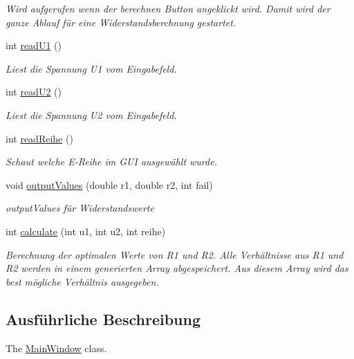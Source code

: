 \begin{DoxyCompactItemize}
\begin{DoxyCompactList}\small\item\em Wird aufgerufen wenn der berechnen Button angeklickt wird. Damit wird der ganze Ablauf für eine Widerstandsberchnung gestartet. \end{DoxyCompactList}\item 
int \hyperlink{classMainWindow_a3b94ad2c855f6a0df3579c48b1a6f6fd}{read\+U1} ()
\begin{DoxyCompactList}\small\item\em Liest die Spannung U1 vom Eingabefeld. \end{DoxyCompactList}\item 
int \hyperlink{classMainWindow_ab9a4bb81031d0bcb5cc5d181a26f3429}{read\+U2} ()
\begin{DoxyCompactList}\small\item\em Liest die Spannung U2 vom Eingabefeld. \end{DoxyCompactList}\item 
int \hyperlink{classMainWindow_a4869d3468f1124ae508be8e177b66ed3}{read\+Reihe} ()
\begin{DoxyCompactList}\small\item\em Schaut welche E-\/\+Reihe im G\+UI ausgewählt wurde. \end{DoxyCompactList}\item 
void \hyperlink{classMainWindow_a12b9bbad12422386cec9da99c2ea3d57}{output\+Values} (double r1, double r2, int fail)
\begin{DoxyCompactList}\small\item\em output\+Values für Widerstandswerte \end{DoxyCompactList}\item 
int \hyperlink{classMainWindow_ab0f78571621e4f8e82f51464648cf017}{calculate} (int u1, int u2, int reihe)
\begin{DoxyCompactList}\small\item\em Berechnung der optimalen Werte von R1 und R2. Alle Verhältnisse aus R1 und R2 werden in einem generierten Array abgespeichert. Aus diesem Array wird das best mögliche Verhältnis ausgegeben. \end{DoxyCompactList}\end{DoxyCompactItemize}


\subsection{Ausführliche Beschreibung}
The \hyperlink{classMainWindow}{Main\+Window} class. 

